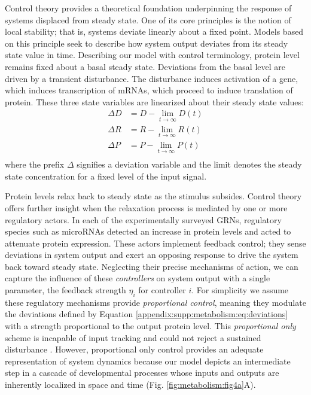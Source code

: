 Control theory provides a theoretical foundation underpinning the response of systems displaced from steady state. One of its core principles is the notion of local stability; that is, systems deviate linearly about a fixed point. Models based on this principle seek to describe how system output deviates from its steady state value in time. Describing our model with control terminology, protein level remains fixed about a basal steady state. Deviations from the basal level are driven by a transient disturbance. The disturbance induces activation of a gene, which induces transcription of mRNAs, which proceed to induce translation of protein. These three state variables are linearized about their steady state values:
\begin{equation}
\label{appendix:supp:metabolism:model:deviations}
\begin{aligned}
\Delta D &= D - \lim_{t \to \infty} D(t) \\
\Delta R &= R - \lim_{t \to \infty} R(t) \\
\Delta P &= P - \lim_{t \to \infty} P(t) \\
\end{aligned}
\end{equation}
where the prefix $\Delta$ signifies a deviation variable and the limit denotes the steady state concentration for a fixed level of the input signal.

Protein levels relax back to steady state as the stimulus subsides. Control theory offers further insight when the relaxation process is mediated by one or more regulatory actors. In each of the experimentally surveyed GRNs, regulatory species such as microRNAs detected an increase in protein levels and acted to attenuate protein expression. These actors implement feedback control; they sense deviations in system output and exert an opposing response to drive the system back toward steady state. Neglecting their precise mechanisms of action, we can capture the influence of these \emph{controllers} on system output with a single parameter, the feedback strength $\eta_i$ for controller $i$. For simplicity we assume these regulatory mechanisms provide \emph{proportional control}, meaning they modulate the deviations defined by Equation \ref{appendix:supp:metabolism:eq:deviations} with a strength proportional to the output protein level. This \emph{proportional only} scheme is incapable of input tracking and could not reject a sustained disturbance \cite{Yi2000}. However, proportional only control provides an adequate representation of system dynamics because our model depicts an intermediate step in a cascade of developmental processes whose inputs and outputs are inherently localized in space and time (Fig. \ref{fig:metabolism:fig4a}A).

